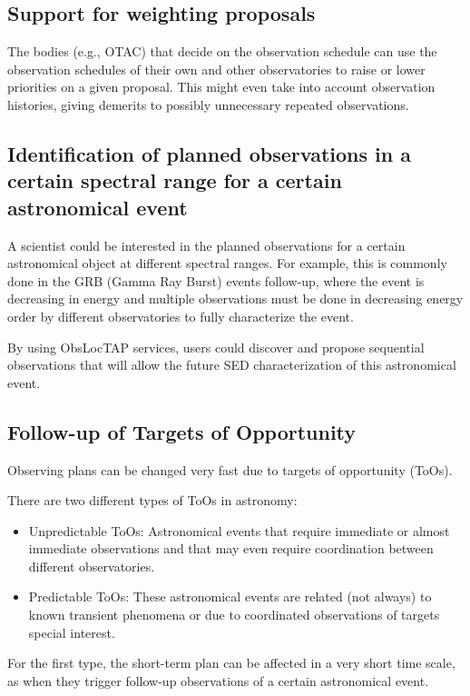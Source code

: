 \documentclass[11pt,a4paper]{ivoa}
\begin{document}
\subsection{Support for weighting proposals}
The bodies (e.g., OTAC) that decide on the observation schedule can use the observation 
schedules of their own and other observatories to raise or lower priorities on a given 
proposal. This might even take into   account observation histories, giving demerits to 
possibly unnecessary   repeated observations.

\subsection{Identification of planned observations in a certain spectral range for a certain astronomical event}
A scientist could be interested in the planned observations for a certain astronomical 
object at different spectral ranges. For example, this is commonly done in the GRB 
(Gamma Ray Burst) events follow-up, where the event is decreasing in energy and multiple 
observations must be done in decreasing energy order by different observatories to fully 
characterize the event.

By using ObsLocTAP services, users could discover and propose sequential observations 
that will allow the future SED characterization of this astronomical event.

\subsection{Follow-up of Targets of Opportunity}
Observing plans can be changed very fast due to targets of opportunity (ToOs).

There are two different types of ToOs in astronomy:
\begin{itemize}
	\item Unpredictable ToOs: Astronomical events that require immediate or almost immediate observations and that may even require coordination between different observatories.

	\item Predictable ToOs: These astronomical events are related (not always) to known transient phenomena or due to coordinated observations of targets special interest. 
\end{itemize}

For the first type, the short-term plan can be affected in a very short time scale, as 
when they trigger follow-up observations of a certain astronomical event.
\end{document}
